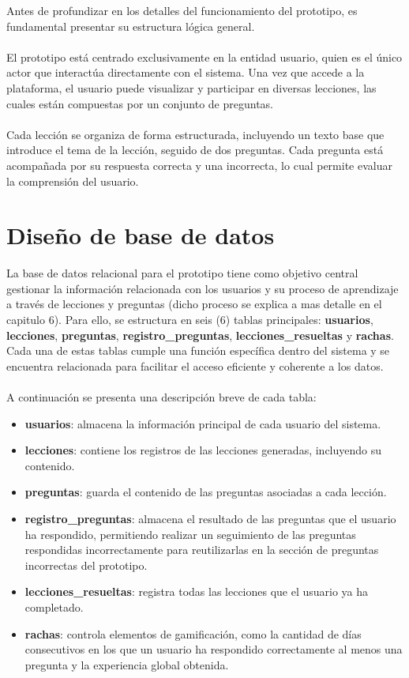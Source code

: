 Antes de profundizar en los detalles del funcionamiento del prototipo, es fundamental presentar su estructura lógica general.
\\
\\
El prototipo está centrado exclusivamente en la entidad usuario, quien es el único actor que interactúa directamente con el sistema. Una vez que accede a la plataforma, el usuario puede visualizar y participar en diversas lecciones, las cuales están compuestas por un conjunto de preguntas.
\\
\\
Cada lección se organiza de forma estructurada, incluyendo un texto base que introduce el tema de la lección, seguido de dos preguntas. Cada pregunta está acompañada por su respuesta correcta y una incorrecta, lo cual permite evaluar la comprensión del usuario.

\section{Diseño de base de datos}
\noindent La base de datos relacional para el prototipo tiene como objetivo central gestionar la información relacionada con los usuarios y su proceso de aprendizaje a través de lecciones y preguntas (dicho proceso se explica a mas detalle en el capitulo 6). Para ello, se estructura en seis (6) tablas principales: \textbf{usuarios}, \textbf{lecciones}, \textbf{preguntas}, \textbf{registro\_preguntas}, \textbf{lecciones\_resueltas} y \textbf{rachas}. Cada una de estas tablas cumple una función específica dentro del sistema y se encuentra relacionada para facilitar el acceso eficiente y coherente a los datos.
\\
\\
A continuación se presenta una descripción breve de cada tabla:
\begin{itemize}
  \item \textbf{usuarios}: almacena la información principal de cada usuario del sistema.
  \item \textbf{lecciones}: contiene los registros de las lecciones generadas, incluyendo su contenido.
  \item \textbf{preguntas}: guarda el contenido de las preguntas asociadas a cada lección.
  \item \textbf{registro\_preguntas}: almacena el resultado de las preguntas que el usuario ha respondido, permitiendo realizar un seguimiento de las preguntas respondidas incorrectamente para reutilizarlas en la sección de preguntas incorrectas del prototipo.
  \item \textbf{lecciones\_resueltas}: registra todas las lecciones que el usuario ya ha completado.
  \item \textbf{rachas}: controla elementos de gamificación, como la cantidad de días consecutivos en los que un usuario ha respondido correctamente al menos una pregunta y la experiencia global obtenida.
\end{itemize}

